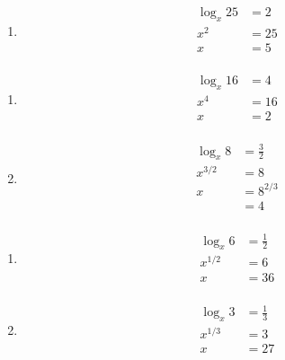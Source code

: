 \documentclass{exam}
\begin{document}
\begin{description}
\begin{enumerate}[a]
        \item 
          \begin{align*}
            \log_x 25     &= 2 \\
            x^2           &= 25 \\
            x             &= \boxed{5} \\
          \end{align*}
      \end{enumerate}

    \item[31]
      \begin{enumerate}[a]
        \item 
          \begin{align*}
            \log_x 16     &= 4 \\
            x^4           &= 16 \\
            x             &= \boxed{2} \\
          \end{align*}

        \item 
          \begin{align*}
            \log_x 8     &= \frac{3}{2} \\
            x^{3/2}      &= 8 \\
            x            &= 8^{2/3} \\
                         &= \boxed{4} \\
          \end{align*}
      \end{enumerate}

    \item[32]
      \begin{enumerate}[a]
        \item 
          \begin{align*}
            \log_x 6     &= \frac{1}{2} \\
            x^{1/2}      &= 6 \\
            x            &= \boxed{36} \\
          \end{align*}

        \item 
          \begin{align*}
            \log_x 3     &= \frac{1}{3} \\
            x^{1/3}      &= 3 \\
            x            &= \boxed{27} \\
          \end{align*}
      \end{enumerate}


\end{description}
\end{document}
